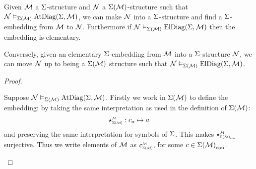 \begin{prop}
    Given $\mathcal{M}$ a $\Sigma$-structure and 
    $\mathcal{N}$ a $\Sigma(\mathcal{M})$-structure such that
    $\mathcal{N} \vDash_{\Sigma(\mathcal{M})} \mathrm{AtDiag}(\Sigma,\mathcal{M})$,
    we can make $\mathcal{N}$ into a $\Sigma$-structure and find
    a $\Sigma$-embedding from $\mathcal{M}$ to $\mathcal{N}$.
    Furthermore if
    $\mathcal{N} \vDash_{\Sigma(\mathcal{M})} \mathrm{ElDiag}(\Sigma,\mathcal{M})$ then 
    the embedding is elementary.

    Conversely, given an elementary $\Sigma$-embedding from 
    $\mathcal{M}$ into a $\Sigma$-structure $\mathcal{N}$, 
    we can move $\mathcal{N}$ up to being a $\Sigma(\mathcal{M})$ structure such that 
    $\mathcal{N} \vDash_{\Sigma(\mathcal{M})} \mathrm{ElDiag}(\Sigma,\mathcal{M})$.
\end{prop}
\begin{proof}
    \begin{forward}
        Suppose $\mathcal{N} \vDash_{\Sigma(\mathcal{M})} \mathrm{AtDiag}(\Sigma,\mathcal{M})$.
        Firstly we work in $\Sigma(\mathcal{M})$ to define the embedding:
        by taking the same interpretation as used in the 
        definition of $\Sigma(\mathcal{M})$: 
        \[\intp{\Si(\MM)}{\MM} : c_a \mapsto a\]
        and preserving the same interpretation for symbols of $\Sigma$.
        This makes $\intp{\const{\Si(\MM)}}{\MM}$ surjective.
        Thus we write elements of ${\mathcal{M}}$ as 
        $\subintp{\Si(\MM)}{\MM}{c}$, 
        for some $c \in {\Sigma(\mathcal{M})}_\mathrm{con}$.
        

\end{forward}
\end{proof}
